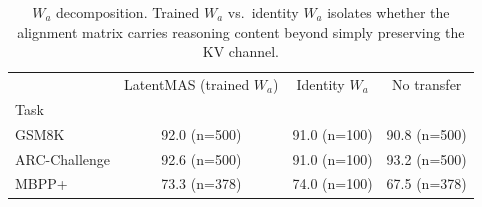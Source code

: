 \begin{table}
\caption{$W_a$ decomposition. Trained $W_a$ vs.\ identity $W_a$ isolates whether the alignment matrix carries reasoning content beyond simply preserving the KV channel.}
\label{tab:wa_ablation}
\begin{tabular}{lccc}
\toprule
 & LatentMAS (trained $W_a$) & Identity $W_a$ & No transfer \\
Task &  &  &  \\
\midrule
GSM8K & 92.0 (n=500) & 91.0 (n=100) & 90.8 (n=500) \\
ARC-Challenge & 92.6 (n=500) & 91.0 (n=100) & 93.2 (n=500) \\
MBPP+ & 73.3 (n=378) & 74.0 (n=100) & 67.5 (n=378) \\
\bottomrule
\end{tabular}
\end{table}
